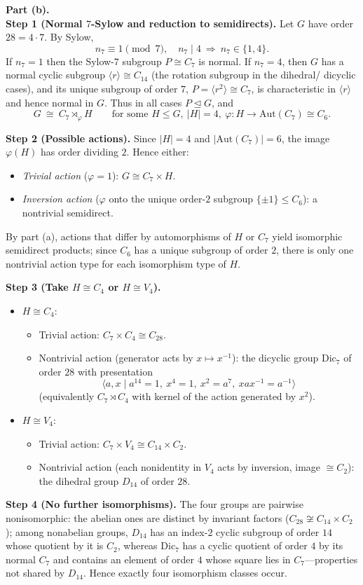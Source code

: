 \documentclass[11pt]{article}
\theoremstyle{definition}
\newcommand{\Aut}{\mathrm{Aut}}
\begin{document}
\textbf{Part (b).}\\
\textbf{Step 1 (Normal $7$-Sylow and reduction to semidirects).} Let $G$ have order $28=4\cdot 7$. By Sylow,
\[
n_7\equiv 1\pmod 7,\quad n_7\mid 4\ \Rightarrow\ n_7\in\{1,4\}.
\]
If $n_7=1$ then the Sylow-$7$ subgroup $P\cong C_7$ is normal. If $n_7=4$, then $G$ has a normal cyclic subgroup $\langle r\rangle\cong C_{14}$ (the rotation subgroup in the dihedral/ dicyclic cases), and its unique subgroup of order $7$, $P=\langle r^2\rangle\cong C_7$, is characteristic in $\langle r\rangle$ and hence normal in $G$. Thus in all cases $P\trianglelefteq G$, and
\[
G\ \cong\ C_7\rtimes_\varphi H\qquad\text{for some }H\le G,\ |H|=4,\ \varphi:H\to\Aut(C_7)\cong C_6.
\]

\textbf{Step 2 (Possible actions).} Since $|H|=4$ and $|\Aut(C_7)|=6$, the image $\varphi(H)$ has order dividing $2$. Hence either:
\begin{itemize}
  \item \emph{Trivial action} ($\varphi=1$): $G\cong C_7\times H$.
  \item \emph{Inversion action} ($\varphi$ onto the unique order-$2$ subgroup $\{\pm 1\}\le C_6$): a nontrivial semidirect.
\end{itemize}
By part (a), actions that differ by automorphisms of $H$ or $C_7$ yield isomorphic semidirect products; since $C_6$ has a unique subgroup of order $2$, there is only one nontrivial action type for each isomorphism type of $H$.

\textbf{Step 3 (Take $H\cong C_4$ or $H\cong V_4$).}
\begin{itemize}
  \item $H\cong C_4$:
    \begin{itemize}
      \item Trivial action: $C_7\times C_4\cong C_{28}$.
      \item Nontrivial action (generator acts by $x\mapsto x^{-1}$): the dicyclic group $\mathrm{Dic}_7$ of order $28$ with presentation
      \[
      \langle a,x\mid a^{14}=1,\ x^4=1,\ x^2=a^7,\ xax^{-1}=a^{-1}\rangle
      \]
      (equivalently $C_7\rtimes C_4$ with kernel of the action generated by $x^2$).
    \end{itemize}
  \item $H\cong V_4$:
    \begin{itemize}
      \item Trivial action: $C_7\times V_4\cong C_{14}\times C_2$.
      \item Nontrivial action (each nonidentity in $V_4$ acts by inversion, image $\cong C_2$): the dihedral group $D_{14}$ of order $28$.
    \end{itemize}
\end{itemize}

\textbf{Step 4 (No further isomorphisms).} The four groups are pairwise nonisomorphic: the abelian ones are distinct by invariant factors ($C_{28}\not\cong C_{14}\times C_2$); among nonabelian groups, $D_{14}$ has an index-$2$ cyclic subgroup of order $14$ whose quotient by it is $C_2$, whereas $\mathrm{Dic}_7$ has a cyclic quotient of order $4$ by its normal $C_7$ and contains an element of order $4$ whose square lies in $C_7$—properties not shared by $D_{14}$. Hence exactly four isomorphism classes occur.
\end{document}
